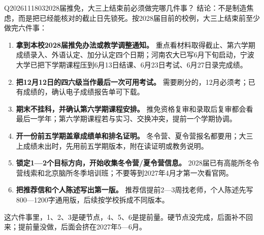 \begin{qa}{Q2026111803}{2028届推免，大三上结束前必须做完哪几件事？}
结论：不是制造焦虑，而是把已经能核对的截止日先锁死。按2028届目前的校例，大三上结束前至少做完六件事：

\begin{enumerate}
\item \textbf{拿到本校2028届推免办法或教学调整通知。} 重点看材料取得截止、第六学期成绩录入、外语认定、加分认定四个日期；河南农大已写6月下旬启动，宁波大学已把下学期课程压到6月13日结课、6月23日考试、6月27日录完成绩。
\item \textbf{把12月12日的四六级当作最后一次可用考试。} 需要刷分的，12月必须考；已有成绩的，确认电子成绩报告单可下载。
\item \textbf{期末不挂科，并确认第六学期课程安排。} 推免资格复审和录取后复审都会看最后一学年；第六学期课程若与实习、交换冲突，提前一个学期协调。
\item \textbf{开一份前五学期盖章成绩单和排名证明。} 冬令营、夏令营报名都要用；大三上成绩未出时，先用前五学期版本，附在读证明或教务说明。
\item \textbf{锁定1—2个目标方向，开始收集冬令营/夏令营信息。} 2028届已有高能所冬令营线索和北京脑所冬季培训班；不要等到2027年4月才第一次看官网。
\item \textbf{把推荐信和个人陈述写出第一版。} 推荐信提前2—3周找老师，个人陈述先写800—1200字通用版，后续按学校拆成不同版本。
\end{enumerate}

这六件事里，1、2、3是硬节点，4、5、6是提前量。硬节点没完成，后面补不回来；提前量没做，后面会挤在2027年5—6月。
\end{qa}
